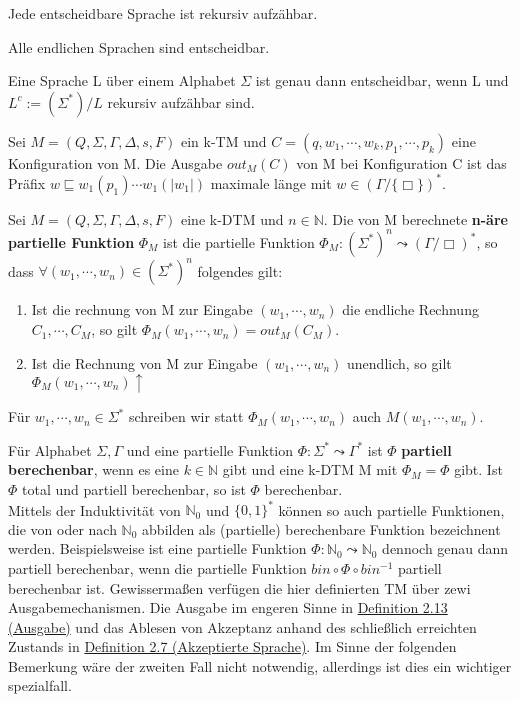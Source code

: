   Jede entscheidbare Sprache ist rekursiv aufzähbar.

  Alle endlichen Sprachen sind entscheidbar.

  Eine Sprache L über einem Alphabet \(\Sigma\) ist genau dann entscheidbar, wenn L und \(L^c :=(\Sigma^*)/L\) rekursiv aufzähbar sind.

  Sei \(M = (Q, \Sigma, \Gamma, \Delta, s, F)\) ein k-TM und \(C = (q, w_1, \cdots, w_k, p_1, \cdots, p_k)\) eine Konfiguration von M. Die Ausgabe \(out_M(C)\) von M bei Konfiguration C ist das Präfix \(w \sqsubseteq w_1(p_1) \cdots w_1(|w_1|)\) maximale länge mit \(w \in (\Gamma / \{\Box\})^*\).

  Sei \(M = (Q, \Sigma, \Gamma, \Delta, s, F)\) eine k-DTM und \(n \in \mathbb{N}\). Die von M berechnete \textbf{n-äre partielle Funktion} \(\Phi_M\) ist die partielle Funktion \(\Phi_M : (\Sigma^*)^n \leadsto (\Gamma / {\Box})^*\), so dass \(\forall (w_1, \cdots, w_n) \in (\Sigma^*)^n\) folgendes gilt:
  \begin{enumerate}
    \item Ist die rechnung von M zur Eingabe \((w_1, \cdots, w_n)\) die endliche Rechnung \(C_1, \cdots, C_M\), so gilt \(\Phi_M(w_1, \cdots, w_n) = out_M(C_M)\).
    \item Ist die Rechnung von M zur Eingabe \((w_1, \cdots, w_n)\) unendlich, so gilt \(\Phi_M(w_1, \cdots, w_n)\uparrow\) 
  \end{enumerate}
  Für \(w_1, \cdots, w_n \in \Sigma^*\) schreiben wir statt \(\Phi_M(w_1, \cdots, w_n)\) auch \(M(w_1, \cdots, w_n)\).

  Für Alphabet \(\Sigma, \Gamma\) und eine partielle Funktion \(\Phi : \Sigma^* \leadsto \Gamma^*\) ist \(\Phi\) \textbf{partiell berechenbar}, wenn es eine \(k \in \mathbb{N}\) gibt und eine k-DTM M mit \(\Phi_M = \Phi\) gibt. Ist \(\Phi\) total und partiell berechenbar, so ist \(\Phi\) berechenbar.\\
  
  Mittels der Induktivität von \(\mathbb{N}_0\) und \(\{0, 1\}^*\) können so auch partielle Funktionen, die von oder nach \(\mathbb{N}_0\) abbilden als (partielle) berechenbare Funktion bezeichnent werden. Beispielsweise ist eine partielle Funktion \(\Phi : \mathbb{N}_0 \leadsto \mathbb{N}_0\) dennoch genau dann partiell berechenbar, wenn die partielle Funktion \(bin \circ \Phi \circ bin^{-1}\) partiell berechenbar ist. Gewissermaßen verfügen die hier definierten TM über zewi Ausgabemechanismen. Die Ausgabe im engeren Sinne in \hyperref[subsec:2.13]{Definition 2.13 (Ausgabe)} und das Ablesen von Akzeptanz anhand des schließlich erreichten Zustands in \hyperref[subsec:2.7]{Definition 2.7 (Akzeptierte Sprache)}. Im Sinne der folgenden Bemerkung wäre der zweiten Fall nicht notwendig, allerdings ist dies ein wichtiger spezialfall.\\

